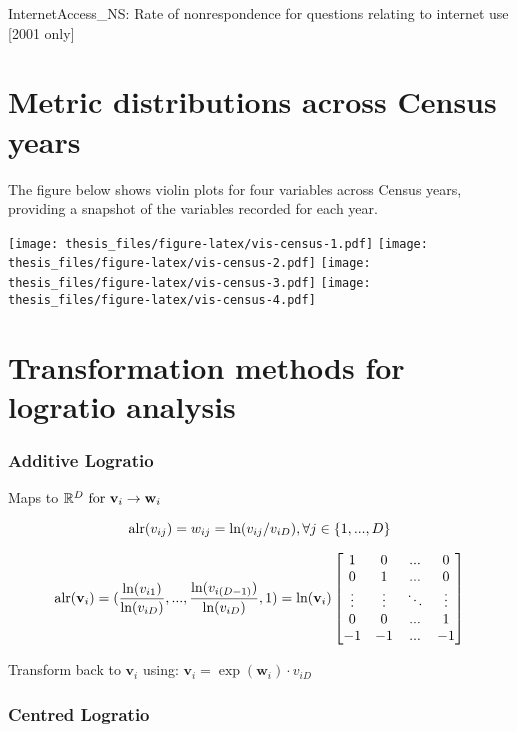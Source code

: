 \documentclass{monashthesis}
\theoremstyle{definition}
\theoremstyle{definition}
\theoremstyle{definition}
\theoremstyle{remark}
\begin{document}
InternetAccess\_NS: Rate of nonrespondence for questions relating to
internet use {[}2001 only{]}

\chapter{Metric distributions across Census
years}\label{metric-distributions-across-census-years}

The figure below shows violin plots for four variables across Census
years, providing a snapshot of the variables recorded for each year.

\texttt{[image: thesis\_files/figure-latex/vis-census-1.pdf]}
\texttt{[image: thesis\_files/figure-latex/vis-census-2.pdf]}
\texttt{[image: thesis\_files/figure-latex/vis-census-3.pdf]}
\texttt{[image: thesis\_files/figure-latex/vis-census-4.pdf]}

\chapter{Transformation methods for logratio
analysis}\label{transformation-methods-for-logratio-analysis}

\subsection{Additive Logratio}\label{additive-logratio}

Maps to \(\mathbb{R}^{D} \text{ for } {\bf v}_i \to {\bf w}_i\)

\[\text{alr}(v_{ij}) = w_{ij} = \text{ln}(v_{ij}/v_{iD}), \space \forall \space j \in \{1,...,D\}\]

\[\text{alr}({\bf v}_i) = (\frac{\text{ln}(v_{i1})}{\text{ln}(v_{iD})}, ..., \frac{\text{ln}(v_{i(D-1)})}{\text{ln}(v_{iD})}, 1) = \text{ln}({\bf v}_i)\space \begin{bmatrix}
    1 & 0 & ... & 0 \\
    0 & 1 & ... & 0 \\
    \vdots & \vdots & \ddots & \vdots \\
    0 & 0 & ... & 1 \\
    -1 & -1 & ... & -1
\end{bmatrix}\]

Transform back to \(\textbf{v}_i\) using:
\(\textbf{v}_i = \exp(\textbf{w}_i) \cdot v_{iD}\)

\subsection{Centred Logratio}\label{centred-logratio}
\end{document}
